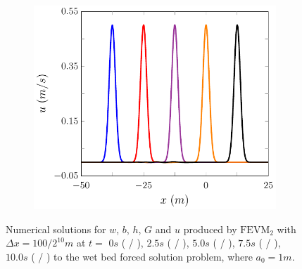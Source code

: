 \begin{figure}
\begin{subfigure}{0.5\textwidth}
		\includegraphics[width=\textwidth]{./chp5/figures/Forced/Wet/FEVMu.pdf}
	\end{subfigure}
	\caption{Numerical solutions for $w$, $b$, $h$, $G$ and $u$ produced by $\text{FEVM}_2$ with $\Delta x = 100 / 2^{10}m$ at $t=$ $0s$ ({\color{blue} \solidrule} /  ), $2.5s$ ({\color{red} \solidrule}/ ), $5.0s$ ({\color{violet!80!white} \solidrule} / ), $7.5s$ ({\color{orange} \solidrule}/ ), $10.0s$ ({\color{black} \solidrule} / ) to the wet bed forced solution problem, where $a_0 = 1m$.}
	\label{fig:ForcedWetFEVMP2PExAll}
\end{figure}
